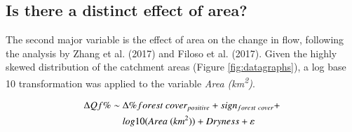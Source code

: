 \documentclass[]{elsarticle} %
\begin{document}
\hypertarget{is-there-a-distinct-effect-of-area}{%
\subsection{Is there a distinct effect of area?}\label{is-there-a-distinct-effect-of-area}}

The second major variable is the effect of area on the change in flow, following the analysis by Zhang et al. (2017) and Filoso et al. (2017). Given the highly skewed distribution of the catchment areas (Figure \ref{fig:datagraphs}), a log base 10 transformation was applied to the variable \emph{Area (km\textsuperscript{2})}.

\begin{align}
\Delta Qf \% \sim ~ & \Delta \% forest~cover_{positive} + sign_{forest~cover} + \notag \\ & log10(Area ~(km^2)) + Dryness + \varepsilon \label{eq:eq6}
\end{align}
\end{document}

